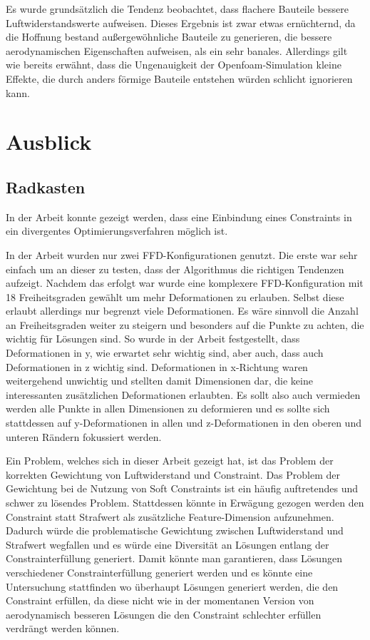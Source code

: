 Es wurde grundsätzlich die Tendenz beobachtet, dass flachere Bauteile bessere Luftwiderstandswerte aufweisen.
Dieses Ergebnis ist zwar etwas ernüchternd, da die Hoffnung bestand außergewöhnliche Bauteile zu generieren, die bessere aerodynamischen Eigenschaften aufweisen, als ein sehr banales.
Allerdings gilt wie bereits erwähnt, dass die Ungenauigkeit der Openfoam-Simulation kleine Effekte, die durch anders förmige Bauteile entstehen würden schlicht ignorieren kann.

\section{Ausblick}

\subsection{Radkasten}

In der Arbeit konnte gezeigt werden, dass eine Einbindung eines Constraints in ein divergentes Optimierungsverfahren möglich ist.

In der Arbeit wurden nur zwei FFD-Konfigurationen genutzt.
Die erste war sehr einfach um an dieser zu testen, dass der Algorithmus die richtigen Tendenzen aufzeigt.
Nachdem das erfolgt war wurde eine komplexere FFD-Konfiguration mit 18 Freiheitsgraden gewählt um mehr Deformationen zu erlauben.
Selbst diese erlaubt allerdings nur begrenzt viele Deformationen.
Es wäre sinnvoll die Anzahl an Freiheitsgraden weiter zu steigern und besonders auf die Punkte zu achten, die wichtig für Lösungen sind.
So wurde in der Arbeit festgestellt, dass Deformationen in y, wie erwartet sehr wichtig sind, aber auch, dass auch Deformationen in z wichtig sind.
Deformationen in x-Richtung waren weitergehend unwichtig und stellten damit Dimensionen dar, die keine interessanten zusätzlichen Deformationen erlaubten.
Es sollt also auch vermieden werden alle Punkte in allen Dimensionen zu deformieren und es sollte sich stattdessen auf y-Deformationen in allen und z-Deformationen in den oberen und unteren Rändern fokussiert werden.

Ein Problem, welches sich in dieser Arbeit gezeigt hat, ist das Problem der korrekten Gewichtung von Luftwiderstand und Constraint.
Das Problem der Gewichtung bei de Nutzung von Soft Constraints ist ein häufig auftretendes und schwer zu lösendes Problem.
Stattdessen könnte in Erwägung gezogen werden den Constraint statt Strafwert als zusätzliche Feature-Dimension aufzunehmen.
Dadurch würde die problematische Gewichtung zwischen Luftwiderstand und Strafwert wegfallen und es würde eine Diversität an Lösungen entlang der Constrainterfüllung generiert.
Damit könnte man garantieren, dass Lösungen verschiedener Constrainterfüllung generiert werden und es könnte eine Untersuchung stattfinden wo überhaupt Lösungen generiert werden, die den Constraint erfüllen, da diese nicht wie in der momentanen Version von aerodynamisch besseren Lösungen die den Constraint schlechter erfüllen verdrängt werden können.

